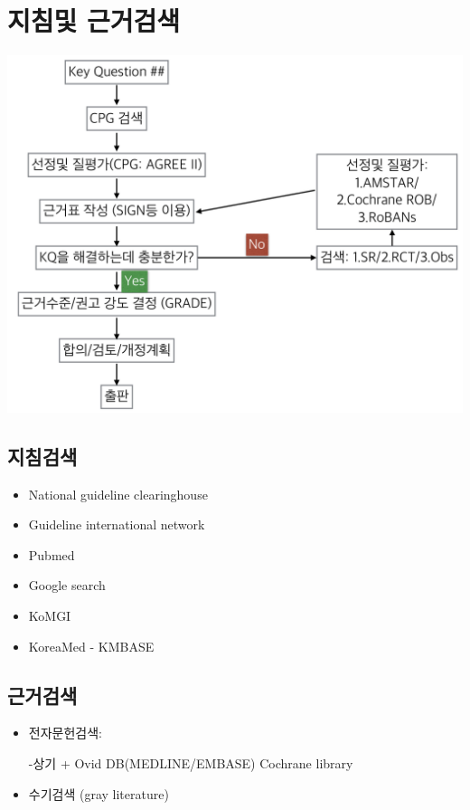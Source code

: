 \documentclass[]{book}
\providecommand{\tightlist}{%
  \setlength{\itemsep}{0pt}\setlength{\parskip}{0pt}}
\begin{document}
\hypertarget{section-16}{%
\chapter{지침및 근거검색}\label{section-16}}

\includegraphics{static/SearchProcess.png}

\hypertarget{section-17}{%
\section{지침검색}\label{section-17}}

\begin{itemize}
\tightlist
\item
  National guideline clearinghouse
\item
  Guideline international network
\item
  Pubmed
\item
  Google search
\item
  KoMGI
\item
  KoreaMed - KMBASE
\end{itemize}

\hypertarget{section-18}{%
\section{근거검색}\label{section-18}}

\begin{itemize}
\item
  전자문헌검색:

  -상기 + Ovid DB(MEDLINE/EMBASE) Cochrane library
\item
  수기검색 (gray literature)
\end{itemize}
\end{document}
